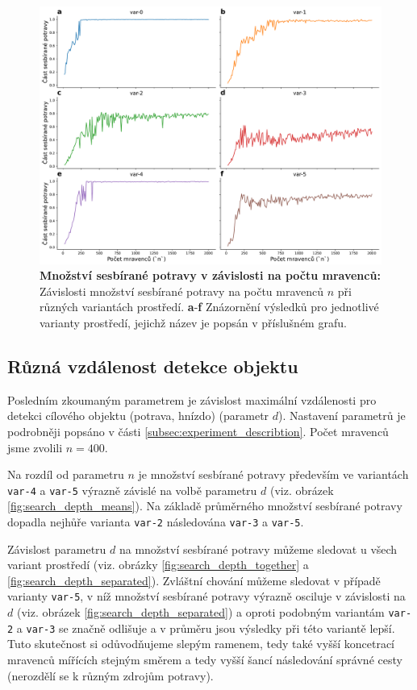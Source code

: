 \documentclass[10pt,a4paper,twocolumn]{article}
\begin{document}
\begin{figure}[tb]
  \centering
  \includegraphics[width=0.98\linewidth]{images/num_ants_variants_separated.pdf}
  \caption{\textbf{Množství sesbírané potravy v závislosti na počtu mravenců:}
  Závislosti množství sesbírané potravy na počtu 
  mravenců $n$ při různých variantách prostředí. \textbf{a}-\textbf{f} 
  Znázornění výsledků pro jednotlivé varianty prostředí, jejichž název je popsán
  v příslušném grafu.}
  \label{fig:num_ants_separated}
\end{figure}



\subsection{Různá vzdálenost detekce objektu}

Posledním zkoumaným parametrem je závislost maximální vzdálenosti
pro detekci cílového objektu (potrava, hnízdo) (parametr $d$).
Nastavení parametrů je podrobněji popsáno v části 
\ref{subsec:experiment_describtion}. Počet mravenců jsme zvolili 
$n=400$.

Na rozdíl od parametru $n$ je množství sesbírané potravy především
ve variantách \texttt{var-4} a \texttt{var-5} výrazně závislé na
volbě parametru $d$ (viz. obrázek \ref{fig:search_depth_means}).
Na základě průměrného množství sesbírané potravy dopadla nejhůře
varianta \texttt{var-2} následována \texttt{var-3} a \texttt{var-5}.

Závislost parametru $d$ na množství sesbírané potravy můžeme 
sledovat u všech variant prostředí (viz. obrázky 
\ref{fig:search_depth_together} a \ref{fig:search_depth_separated}).
Zvláštní chování můžeme sledovat v případě varianty \texttt{var-5},
v níž množství sesbírané potravy výrazně osciluje v závislosti
na $d$ (viz. obrázek \ref{fig:search_depth_separated}) a oproti 
podobným variantám \texttt{var-2} a \texttt{var-3} se značně 
odlišuje a v průměru jsou výsledky při této variantě lepší. 
Tuto skutečnost si odůvodňujeme slepým ramenem, tedy také
vyšší koncetrací mravenců mířících stejným směrem a tedy vyšší šancí 
následování správné cesty (nerozdělí se k různým zdrojům potravy).
\end{document}
